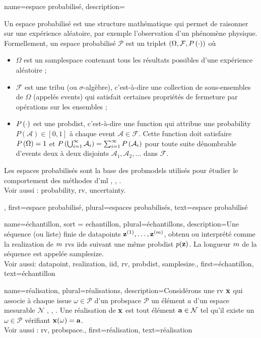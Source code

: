 {name={espace probabilisé}, 
	description={Un espace probabilisé est une structure mathématique qui permet de raisonner sur une expérience aléatoire, par exemple l’observation d’un phénomène physique. 
		Formellement, un espace probabilisé $\mathcal{P}$ est un triplet $(\Omega, \mathcal{F}, P\left(\cdot\right))$ où
		\begin{itemize}
			\item $\Omega$ est un \gls{samplespace} contenant tous les résultats possibles d’une expérience aléatoire ;
			\item $\mathcal{F}$ est une tribu (ou $\sigma$-algèbre), c’est-à-dire une collection de sous-ensembles de $\Omega$ (appelés \glspl{event}) qui satisfait certaines propriétés de fermeture par opérations sur les ensembles ;
			\item $P\left(\cdot\right)$ est une \gls{probdist}, c’est-à-dire une \gls{function} qui attribue une \gls{probability} $P(\mathcal{A}) \in [0,1]$ à chaque \gls{event} $\mathcal{A} \in \mathcal{F}$. Cette \gls{function} doit satisfaire $P\left(\Omega\right) = 1$ et $P\left(\bigcup_{i=1}^{\infty} \mathcal{A}_i\right) = \sum_{i=1}^{\infty} P\left(\mathcal{A}_i\right)$ pour toute suite dénombrable d’\glspl{event} deux à deux disjoints $\mathcal{A}_1, \mathcal{A}_2, \ldots$ dans $\mathcal{F}$.
		\end{itemize}
		Les espaces probabilisés sont la base des \glspl{probmodel} utilisés pour étudier le comportement des méthodes d’\gls{ml} \cite{BillingsleyProbMeasure}, \cite{GrayProbBook}, \cite{ross2013first}.
		\\
		Voir aussi : \gls{probability}, \gls{rv}, \gls{uncertainty}.},  
	first={espace probabilisé}, plural={espaces probabilisés},
	text={espace probabilisé}
}

{name={échantillon}, sort = {echantillon}, plural={échantillons}, 
	description={Une 
		séquence (ou liste) finie de \glspl{datapoint} ${\bf z}^{(1)}, \ldots, {\bf z}^{(m)}$, 
		obtenu ou interprété comme la \gls{realization} de $m$ \glspl{rv} \glspl{iid}
		suivant une même \gls{probdist} $p({\bf z})$. La longueur $m$ 
		de la séquence est appelée \gls{samplesize}.
		\\
		Voir aussi: \gls{datapoint}, \gls{realization}, \gls{iid}, \gls{rv}, \gls{probdist}, \gls{samplesize}.},
	first={échantillon},
	text={échantillon}
}

{name={réalisation}, plural={réalisations},
	description={Considérons une \gls{rv} ${\bf x}$ qui associe à chaque issue $\omega \in \mathcal{P}$ d’un \gls{probspace} $\mathcal{P}$ un élément $a$ d’un espace mesurable $\mathcal{N}$ \cite{RudinBookPrinciplesMatheAnalysis}, \cite{BillingsleyProbMeasure}, \cite{HalmosMeasure}. 
		Une réalisation de ${\bf x}$ est tout élément ${\bf a} \in \mathcal{N}$ tel qu’il existe un $\omega \in \mathcal{P}$ vérifiant ${\bf x}(\omega) = {\bf a}$.
		\\
		Voir aussi : \gls{rv}, \gls{probspace}.}, 
	first={réalisation},
	text={réalisation}  
}

